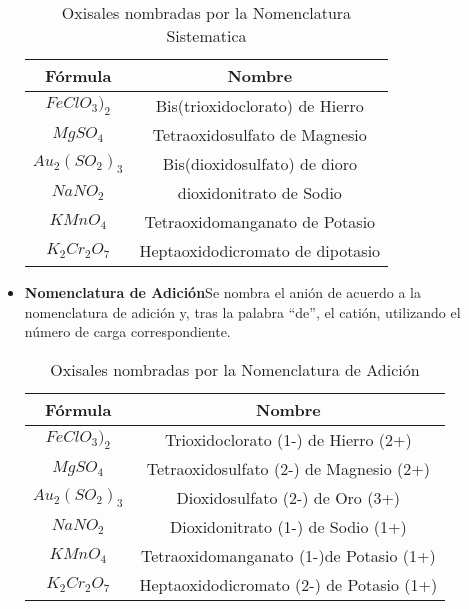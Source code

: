 \documentclass[11pt,fleqn]{book} %
\begin{document}
\begin{itemize}
	\begin{table}[h!]
		\centering
		\begin{tabular}{c|c}
			Fórmula&Nombre \\ \hline
			$FeClO_3)_2$&Bis(trioxidoclorato) de Hierro\\
			$MgSO_4$&Tetraoxidosulfato de Magnesio\\
			$Au_2(SO_2)_3$&Bis(dioxidosulfato) de dioro\\
			$NaNO_2$&dioxidonitrato de Sodio\\
			$KMnO_4$&Tetraoxidomanganato de Potasio\\
			$K_2Cr_2O_7$&Heptaoxidodicromato de dipotasio\\ \hline
		\end{tabular}
		\caption{Oxisales nombradas por la Nomenclatura Sistematica}
	\end{table}
	\item\textbf{Nomenclatura de Adición}Se nombra el anión de acuerdo a la nomenclatura de adición y, tras la palabra “de”, el catión, utilizando el número de carga correspondiente.
	\begin{table}[h!]
		\centering
		\begin{tabular}{c|c}
			Fórmula&Nombre \\ \hline
			$FeClO_3)_2$&Trioxidoclorato (1-) de Hierro (2+)\\
			$MgSO_4$&Tetraoxidosulfato (2-) de Magnesio (2+)\\
			$Au_2(SO_2)_3$&Dioxidosulfato (2-) de Oro (3+)\\
			$NaNO_2$&Dioxidonitrato (1-) de Sodio (1+)\\
			$KMnO_4$&Tetraoxidomanganato (1-)de Potasio (1+)\\
			$K_2Cr_2O_7$&Heptaoxidodicromato (2-) de Potasio (1+)\\ \hline
		\end{tabular}
			\caption{Oxisales nombradas por la Nomenclatura de Adición}
	\end{table}
\end{itemize}
\end{document}
